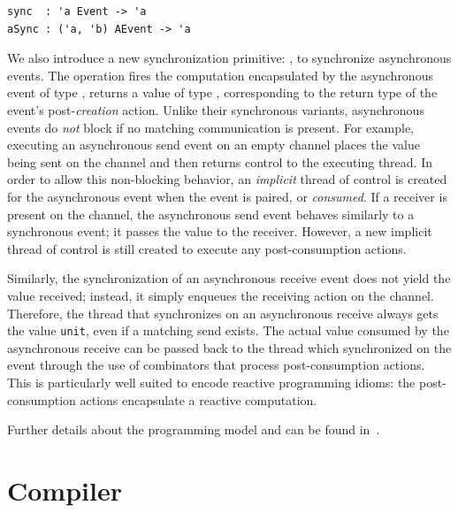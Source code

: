 \lstset{numbers=none}
\begin{lstlisting}
sync  : 'a Event -> 'a
aSync : ('a, 'b) AEvent -> 'a
\end{lstlisting}

We also introduce a new synchronization primitive: , to synchronize
asynchronous events. The  operation fires the computation
encapsulated by the asynchronous event of type , returns a
value of type , corresponding to the return type of the event's
post-{\em creation} action. Unlike their synchronous variants, asynchronous
events do {\em not} block if no matching communication is present.  For
example, executing an asynchronous send event on an empty channel places the
value being sent on the channel and then returns control to the executing
thread. In order to allow this non-blocking behavior, an {\em implicit} thread
of control is created for the asynchronous event when the event is paired, or
{\em consumed}. If a receiver is present on the channel, the asynchronous send
event behaves similarly to a synchronous event; it passes the value to the
receiver. However, a new implicit thread of control is still created to execute
any post-consumption actions.

Similarly, the synchronization of an asynchronous receive event does not yield
the value received; instead, it simply enqueues the receiving action on the
channel. Therefore, the thread that synchronizes on an asynchronous receive
always gets the value {\tt unit}, even if a matching send exists. The actual
value consumed by the asynchronous receive can be passed back to the thread
which synchronized on the event through the use of combinators that process
post-consumption actions.  This is particularly well suited to encode reactive
programming idioms: the post-consumption actions encapsulate a reactive
computation.

Further details about the \MM programming model and \acml can be found
in~\cite{Ziarek11}.

\section{Compiler}

